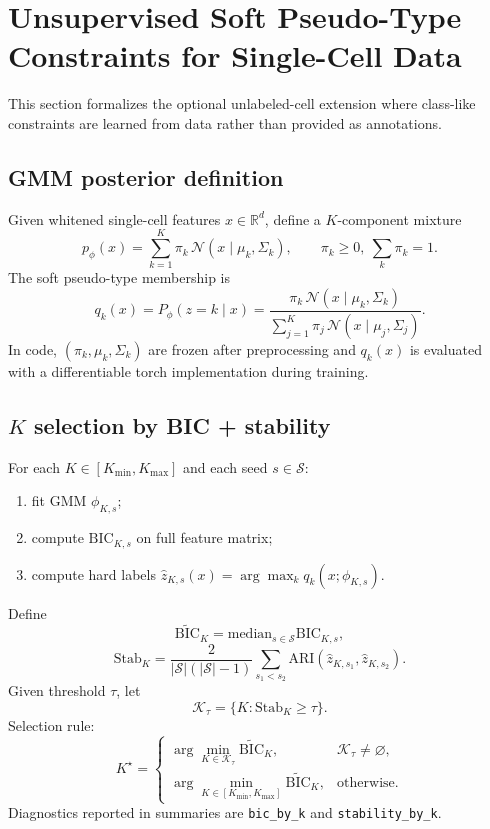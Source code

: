 \documentclass[11pt]{article}
\begin{document}
\section{Unsupervised Soft Pseudo-Type Constraints for Single-Cell Data}
This section formalizes the optional unlabeled-cell extension where class-like constraints are learned from data rather than provided as annotations.

\subsection*{GMM posterior definition}
Given whitened single-cell features $x\in\mathbb{R}^d$, define a $K$-component mixture
\[
p_\phi(x)=\sum_{k=1}^{K}\pi_k\,\mathcal{N}(x\mid \mu_k,\Sigma_k),
\qquad
\pi_k\ge 0,\ \sum_k \pi_k=1.
\]
The soft pseudo-type membership is
\[
q_k(x)=P_\phi(z=k\mid x)
=
\frac{\pi_k\,\mathcal{N}(x\mid\mu_k,\Sigma_k)}
{\sum_{j=1}^{K}\pi_j\,\mathcal{N}(x\mid\mu_j,\Sigma_j)}.
\]
In code, $(\pi_k,\mu_k,\Sigma_k)$ are frozen after preprocessing and $q_k(x)$ is evaluated with a differentiable torch implementation during training.

\subsection*{$K$ selection by BIC + stability}
For each $K\in[K_{\min},K_{\max}]$ and each seed $s\in\mathcal{S}$:
\begin{enumerate}
    \item fit GMM $\phi_{K,s}$;
    \item compute $\mathrm{BIC}_{K,s}$ on full feature matrix;
    \item compute hard labels $\hat{z}_{K,s}(x)=\arg\max_k q_k(x;\phi_{K,s})$.
\end{enumerate}
Define
\[
\widetilde{\mathrm{BIC}}_K=\mathrm{median}_{s\in\mathcal{S}}\mathrm{BIC}_{K,s},
\]
\[
\mathrm{Stab}_K
=
\frac{2}{|\mathcal{S}|(|\mathcal{S}|-1)}
\sum_{s_1<s_2}\mathrm{ARI}\!\left(\hat{z}_{K,s_1},\hat{z}_{K,s_2}\right).
\]
Given threshold $\tau$, let
\[
\mathcal{K}_\tau=\{K:\mathrm{Stab}_K\ge\tau\}.
\]
Selection rule:
\[
K^{\star}=
\begin{cases}
\arg\min_{K\in\mathcal{K}_\tau}\widetilde{\mathrm{BIC}}_K, & \mathcal{K}_\tau\neq\varnothing,\\[4pt]
\arg\min_{K\in[K_{\min},K_{\max}]}\widetilde{\mathrm{BIC}}_K, & \text{otherwise}.
\end{cases}
\]
Diagnostics reported in summaries are \texttt{bic\_by\_k} and \texttt{stability\_by\_k}.
\end{document}
